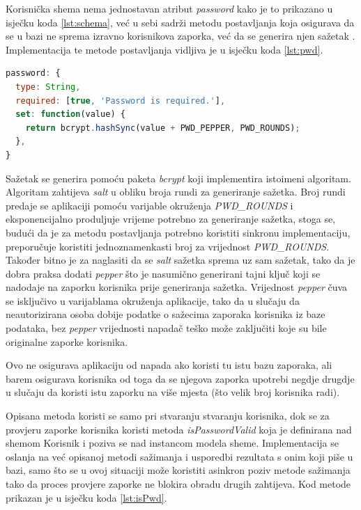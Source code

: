 \documentclass[times, utf8, diplomski, numeric]{fer}
\newcommand{\razmakp}{\vspace{18pt}}
\newcommand{\razmaks}{\vspace{10pt}}
\begin{document}
Korisnička shema nema jednostavan atribut \emph{password} kako je to prikazano u isječku koda \ref{lst:schema}, već u sebi sadrži metodu postavljanja  koja osigurava da se u bazi ne sprema izravno korisnikova zaporka, već da se generira njen sažetak .
Implementacija te metode postavljanja vidljiva je u isječku koda \ref{lst:pwd}.

\razmakp %
\begin{lstlisting}[language=JavaScript, caption={Attribut \emph{password} od sheme Korisnik}, label={lst:pwd}]
password: {
  type: String,
  required: [true, 'Password is required.'],
  set: function(value) {
    return bcrypt.hashSync(value + PWD_PEPPER, PWD_ROUNDS);
  },
}
\end{lstlisting}
\razmaks

Sažetak se generira pomoću paketa \emph{bcrypt} koji implementira istoimeni algoritam.
Algoritam zahtijeva \emph{salt} u obliku broja rundi za generiranje sažetka.
Broj rundi predaje se aplikaciji pomoću varijable okruženja \emph{PWD\_ROUNDS} i eksponencijalno produljuje vrijeme potrebno za generiranje sažetka, stoga se, budući da je za metodu postavljanja potrebno koristiti sinkronu implementaciju, preporučuje koristiti jednoznamenkasti broj za vrijednost \emph{PWD\_ROUNDS}\citep{bcrypt}.
Također bitno je za naglasiti da se \emph{salt} sažetka sprema uz sam sažetak, tako da je dobra praksa dodati \emph{pepper} što je nasumično generirani tajni ključ koji se nadodaje na zaporku korisnika prije generiranja sažetka.
Vrijednost \emph{pepper} čuva se isključivo u varijablama okruženja aplikacije, tako da u slučaju da neautorizirana osoba dobije podatke o sažecima zaporaka korisnika iz baze podataka, bez \emph{pepper} vrijednosti napadač teško može zaključiti koje su bile originalne zaporke korisnika.

Ovo ne osigurava aplikaciju od napada ako koristi tu istu bazu zaporaka, ali barem osigurava korisnika od toga da se njegova zaporka upotrebi negdje drugdje u slučaju da koristi istu zaporku na više mjesta (što velik broj korisnika radi).

\razmakp

Opisana metoda koristi se samo pri stvaranju stvaranju korisnika, dok se za provjeru zaporke korisnika koristi metoda \emph{isPasswordValid} koja je definirana nad shemom Korisnik i poziva se nad instancom modela sheme.
Implementacija se oslanja na već opisanoj metodi sažimanja i usporedbi rezultata s onim koji piše u bazi, samo što se u ovoj situaciji može koristiti asinkron poziv metode sažimanja tako da proces provjere zaporke ne blokira obradu drugih zahtijeva. 
Kod metode prikazan je u isječku koda \ref{lst:isPwd}.
\end{document}
